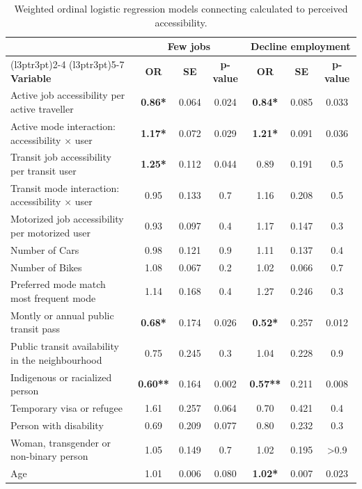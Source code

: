 \documentclass[preprint, 3p,
authoryear]{elsarticle} %
\begin{document}
\begin{table}

\caption{\label{tab:unnamed-chunk-2}\label{tab:models}Weighted ordinal logistic regression models connecting calculated to perceived accessibility.}
\centering
\begin{tabular}[t]{lcccccc}
\toprule
\multicolumn{1}{c}{ } & \multicolumn{3}{c}{\textbf{Few jobs}} & \multicolumn{3}{c}{\textbf{Decline employment}} \\
\cmidrule(l{3pt}r{3pt}){2-4} \cmidrule(l{3pt}r{3pt}){5-7}
\textbf{Variable} & \textbf{OR} & \textbf{SE} & \textbf{p-value} & \textbf{OR} & \textbf{SE} & \textbf{p-value}\\
\midrule
Active job accessibility per active traveller & \textbf{0.86*} & 0.064 & 0.024 & \textbf{0.84*} & 0.085 & 0.033\\
Active mode interaction: accessibility × user & \textbf{1.17*} & 0.072 & 0.029 & \textbf{1.21*} & 0.091 & 0.036\\
Transit job accessibility per transit user & \textbf{1.25*} & 0.112 & 0.044 & 0.89 & 0.191 & 0.5\\
Transit mode interaction: accessibility × user & 0.95 & 0.133 & 0.7 & 1.16 & 0.208 & 0.5\\
Motorized job accessibility per motorized user & 0.93 & 0.097 & 0.4 & 1.17 & 0.147 & 0.3\\
\addlinespace
Number of Cars & 0.98 & 0.121 & 0.9 & 1.11 & 0.137 & 0.4\\
Number of Bikes & 1.08 & 0.067 & 0.2 & 1.02 & 0.066 & 0.7\\
Preferred mode match most frequent mode & 1.14 & 0.168 & 0.4 & 1.27 & 0.246 & 0.3\\
Montly or annual public transit pass & \textbf{0.68*} & 0.174 & 0.026 & \textbf{0.52*} & 0.257 & 0.012\\
Public transit availability in the neighbourhood & 0.75 & 0.245 & 0.3 & 1.04 & 0.228 & 0.9\\
\addlinespace
Indigenous or racialized person & \textbf{0.60**} & 0.164 & 0.002 & \textbf{0.57**} & 0.211 & 0.008\\
Temporary visa or refugee & 1.61 & 0.257 & 0.064 & 0.70 & 0.421 & 0.4\\
Person with disability & 0.69 & 0.209 & 0.077 & 0.80 & 0.232 & 0.3\\
Woman, transgender or non-binary person & 1.05 & 0.149 & 0.7 & 1.02 & 0.195 & >0.9\\
Age & 1.01 & 0.006 & 0.080 & \textbf{1.02*} & 0.007 & 0.023\\

\end{tabular}
\end{table}
\end{document}
